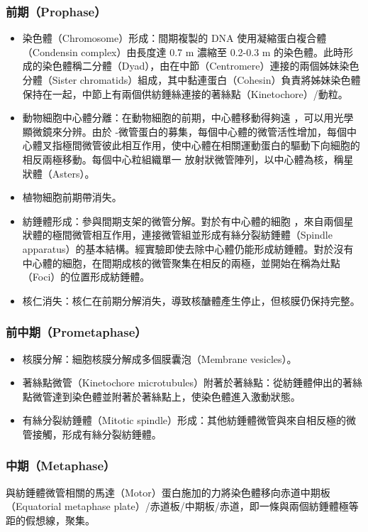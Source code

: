 \documentclass[a4paper,12pt]{report}
\begin{document}
\subsubsection{前期（Prophase）}
\begin{itemize}
  \item 染色體（Chromosome）形成：間期複製的 DNA 使用凝縮蛋白複合體（Condensin complex）由長度達 0.7 \text{\textmu}m 濃縮至 0.2-0.3 \text{\textmu}m 的染色體。此時形成的染色體稱二分體（Dyad），由在中節（Centromere）連接的兩個姊妹染色分體（Sister chromatids）組成，其中黏連蛋白（Cohesin）負責將姊妹染色體保持在一起，中節上有兩個供紡錘絲連接的著絲點（Kinetochore）/動粒。
  \item 動物細胞中心體分離：在動物細胞的前期，中心體移動得夠遠 ，可以用光學顯微鏡來分辨。由於 \text{\textgamma}-微管蛋白的募集，每個中心體的微管活性增加，每個中心體叉指極間微管彼此相互作用，使中心體在相關運動蛋白的驅動下向細胞的相反兩極移動。每個中心粒組織單一 放射狀微管陣列，以中心體為核，稱星狀體（Asters）。
  \item 植物細胞前期帶消失。
  \item 紡錘體形成：參與間期支架的微管分解。對於有中心體的細胞 ，來自兩個星狀體的極間微管相互作用，連接微管組並形成有絲分裂紡錘體（Spindle apparatus）的基本結構。經實驗即使去除中心體仍能形成紡錘體。對於沒有中心體的細胞，在間期成核的微管聚集在相反的兩極，並開始在稱為灶點（Foci）的位置形成紡錘體。
  \item 核仁消失：核仁在前期分解消失，導致核醣體產生停止，但核膜仍保持完整。
\end{itemize}
\subsubsection{前中期（Prometaphase）}
\begin{itemize}
  \item 核膜分解：細胞核膜分解成多個膜囊泡（Membrane vesicles）。
  \item 著絲點微管（Kinetochore microtubules）附著於著絲點：從紡錘體伸出的著絲點微管達到染色體並附著於著絲點上，使染色體進入激動狀態。
  \item 有絲分裂紡錘體（Mitotic spindle）形成：其他紡錘體微管與來自相反極的微管接觸，形成有絲分裂紡錘體。
\end{itemize}
\subsubsection{中期（Metaphase）}
與紡錘體微管相關的馬達（Motor）蛋白施加的力將染色體移向赤道中期板（Equatorial metaphase plate）/赤道板/中期板/赤道，即一條與兩個紡錘體極等距的假想線，聚集。
\end{document}
